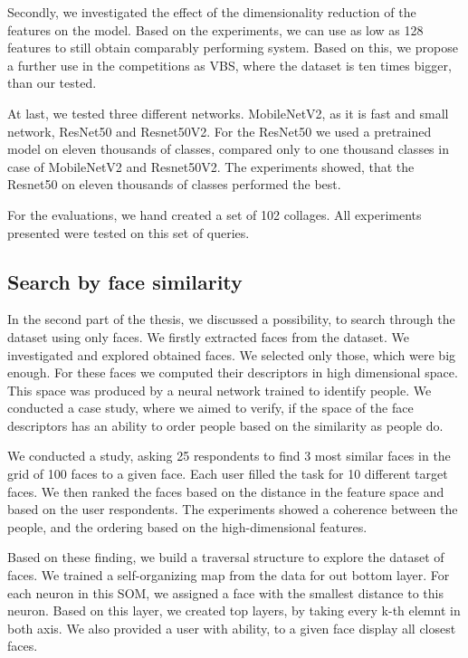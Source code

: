 Secondly, we investigated the effect of the dimensionality reduction of the features on the model. Based on the experiments, we can use as low as 128 features to still obtain comparably performing system. Based on this, we propose a further use in the competitions as VBS, where the dataset is ten times bigger, than our tested.

At last, we tested three different networks. MobileNetV2, as it is fast and small network, ResNet50 and Resnet50V2. For the ResNet50 we used a pretrained model on eleven thousands of classes, compared only to one thousand classes in case of MobileNetV2 and Resnet50V2. The experiments showed, that the Resnet50 on eleven thousands of classes performed the best.

For the evaluations, we hand created a set of 102 collages. All experiments presented were tested on this set of queries.

\subsection*{Search by face similarity}

In the second part of the thesis, we discussed a possibility, to search through the dataset using only faces. We firstly extracted faces from the dataset. We investigated and explored obtained faces. We selected only those, which were big enough. For these faces we computed their descriptors in high dimensional space. This space was produced by a neural network trained to identify people. We conducted a case study, where we aimed to verify, if the space of the face descriptors has an ability to order people based on the similarity as people do.

We conducted a study, asking 25 respondents to find 3 most similar faces in the grid of 100 faces to a given face. Each user filled the task for 10 different target faces. We then ranked the faces based on the distance in the feature space and based on the user respondents. The experiments showed a coherence between the people, and the ordering based on the high-dimensional features.

Based on these finding, we build a traversal structure to explore the dataset of faces. We trained a self-organizing map from the data for out bottom layer. For each neuron in this SOM, we assigned a face with the smallest distance to this neuron. Based on this layer, we created top layers, by taking every k-th elemnt in both axis. We also provided a user with ability, to a given face display all closest faces.

